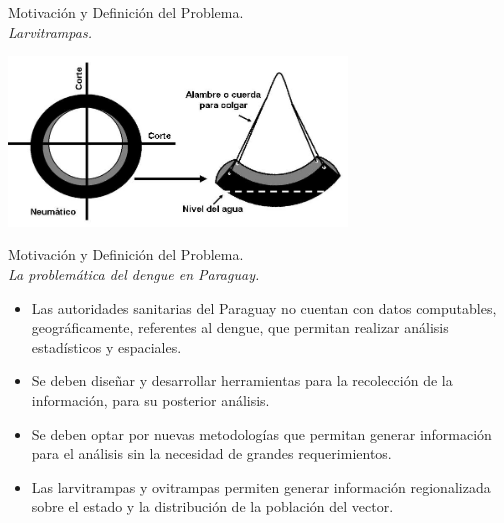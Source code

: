 \begin{frame}[t]{Motivación y Definición del Problema.\\\textit{Larvitrampas.}}
  \begin{center}
    \includegraphics[width=9cm]{../book/anexos/graphics/construccion-larvitrampa.png}
  \end{center}
\end{frame}

\begin{frame}[t]{Motivación y Definición del Problema.\\\textit{La problemática del dengue en Paraguay.}}
  \begin{itemize}

    \item Las autoridades sanitarias del Paraguay no cuentan con datos computables, geográficamente, referentes al dengue, que permitan realizar análisis estadísticos y espaciales.

    \item Se deben diseñar y desarrollar herramientas para la recolección de la información, para su posterior análisis.

    \item Se deben optar por nuevas metodologías que permitan generar información para el análisis sin la necesidad de grandes requerimientos.

    \item Las larvitrampas y ovitrampas permiten generar información regionalizada sobre el estado y la distribución de la población del vector.

  \end{itemize}
\end{frame}

